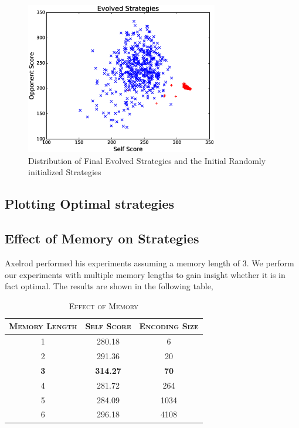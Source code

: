 \documentclass[a4paper]{article}
\begin{document}
	\begin{figure}[H]
	\centering
	\includegraphics[width=0.75\textwidth]{evolvePlot.eps}
	\caption{{Distribution of Final Evolved Strategies and the Initial Randomly initialized Strategies}}
	\end{figure}

	\subsection{Plotting Optimal strategies}

	\subsection{Effect of Memory on Strategies}
	
	Axelrod performed his experiments assuming a memory length of 3. We perform our experiments with multiple memory lengths to gain insight whether it is in fact optimal. The results are shown in the following table,
	
	\begin{table}[H]
	  \begin{center}
	    \begin{tabular}{c|c|c}
	      \toprule
	      \textsc{Memory Length} & \textsc{Self Score} & \textsc{Encoding Size}\\
	      \midrule
	      1 & 280.18 & 6\\
		  2 & 291.36 & 20\\
		  \textbf{3} & \textbf{314.27} & \textbf{70}\\
		  4 & 281.72 & 264\\
		  5 & 284.09 & 1034\\
		  6 & 296.18 & 4108\\		  
		  \bottomrule
	    \end{tabular}
	    \caption{\textsc{Effect of Memory}}
	  \end{center}
	\end{table}  
	
\end{document}
